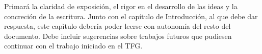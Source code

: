 Primará la claridad de exposición, el rigor en el desarrollo de las ideas y la concreción de la escritura. Junto con el capítulo de Introducción, al que debe dar respuesta, este capìtulo debería poder leerse con autonomía del resto del documento. Debe incluir sugerencias sobre trabajos futuros que pudiesen continuar con el trabajo iniciado en el TFG.

